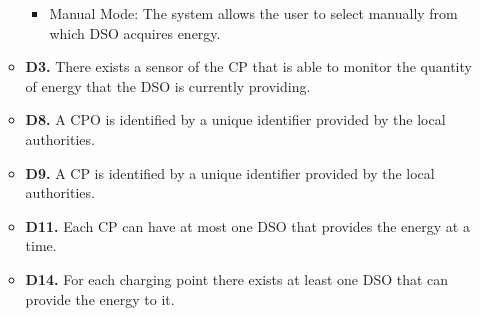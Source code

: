 \documentclass{Configuration_Files/PoliMi3i_thesis}
\begin{document}
\begin{enumerate}[label=\textbf{G\arabic*}]
\begin{itemize}
\begin{itemize}
                    \item Manual Mode: The system allows the user to select manually from which DSO acquires energy.
                \end{itemize}
            \item \textbf{D3.} There exists a sensor of the CP that is able to monitor the quantity of energy that the DSO is currently providing.
            \item \textbf{D8.} A CPO is identified by a unique identifier provided by the local authorities.
            \item \textbf{D9.} A CP is identified by a unique identifier provided by the local authorities.
            \item \textbf{D11.} Each CP can have at most one DSO that provides the energy at a time.
            \item \textbf{D14.} For each charging point there exists at least one DSO that can provide the energy to it.
        \end{itemize}


\end{enumerate}
\end{document}
